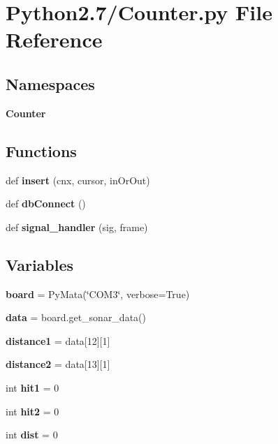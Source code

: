 \section{Python2.7/\+Counter.py File Reference}
\label{_counter_8py}
\subsection*{Namespaces}
\begin{DoxyCompactItemize}
\item 
 {\bf Counter}
\end{DoxyCompactItemize}
\subsection*{Functions}
\begin{DoxyCompactItemize}
\item 
def {\bf insert} (cnx, cursor, in\+Or\+Out)
\item 
def {\bf db\+Connect} ()
\item 
def {\bf signal\+\_\+handler} (sig, frame)
\end{DoxyCompactItemize}
\subsection*{Variables}
\begin{DoxyCompactItemize}
\item 
{\bf board} = Py\+Mata(\char`\"{}C\+O\+M3\char`\"{}, verbose=True)
\item 
{\bf data} = board.\+get\+\_\+sonar\+\_\+data()
\item 
{\bf distance1} = data[12][1]
\item 
{\bf distance2} = data[13][1]
\item 
int {\bf hit1} = 0
\item 
int {\bf hit2} = 0
\item 
int {\bf dist} = 0
\end{DoxyCompactItemize}

